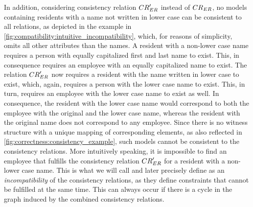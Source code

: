 In addition, considering consistency relation $\consistencyrelation{CR}{ER}'$ instead of $\consistencyrelation{CR}{ER}$, no models containing residents with a name not written in lower case can be consistent to all relations, as depicted in the example in \autoref{fig:compatibility:intuitive_incompatibility}, which, for reasons of simplicity, omits all other attributes than the names.
A resident with a non-lower case name requires a person with equally capitalized first and last name to exist.
This, in consequence requires an employee with an equally capitalized name to exist.
The relation $\consistencyrelation{CR}{ER}'$ now requires a resident with the name written in lower case to exist, which, again, requires a person with the lower case name to exist.
This, in turn, requires an employee with the lower case name to exist as well.
In consequence, the resident with the lower case name would correspond to both the employee with the original and the lower case name, whereas the resident with the original name does not correspond to any employee.
Since there is no witness structure with a unique mapping of corresponding elements, as also reflected in \autoref{fig:correctness:consistency_example}, such models cannot be consistent to the consistency relations.
More intuitively speaking, it is impossible to find an employee that fulfills the consistency relation $\consistencyrelation{CR}{ER}'$ for a resident with a non-lower case name.
This is what we will call and later precisely define as an \emph{incompatibility} of the consistency relations, as they define constraints that cannot be fulfilled at the same time.
This can always occur if there is a cycle in the graph induced by the combined consistency relations.

